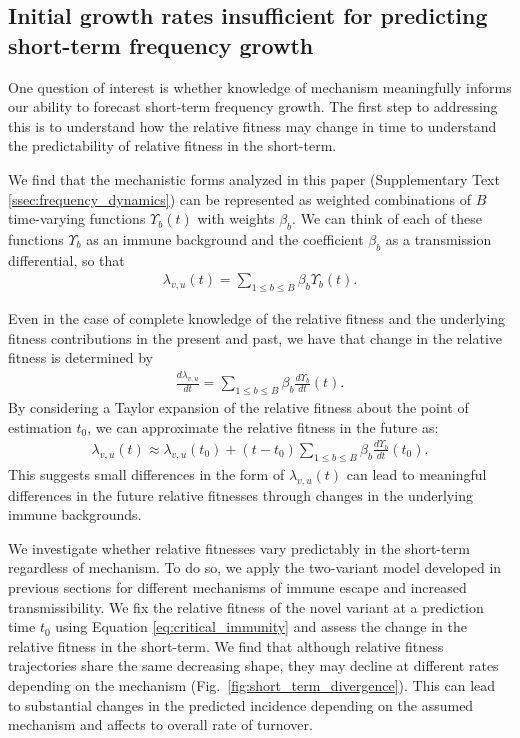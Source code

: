 \documentclass[11pt,oneside,letterpaper]{article}
\begin{document}
\subsection*{Initial growth rates insufficient for predicting short-term frequency growth}

One question of interest is whether knowledge of mechanism meaningfully informs our ability to forecast short-term frequency growth.
The first step to addressing this is to understand how the relative fitness may change in time to understand the predictability of relative fitness in the short-term.

We find that the mechanistic forms analyzed in this paper (Supplementary Text \ref{ssec:frequency_dynamics}) can be represented as weighted combinations of $B$ time-varying functions $\Upsilon_{b}(t)$ with weights $\beta_{b}$.
We can think of each of these functions $\Upsilon_b$ as an immune background and the coefficient $\beta_{b}$ as a transmission differential, so that
\begin{align*}
\lambda_{v,u}(t) = \sum_{1 \leq b \leq B} \beta_{b} \Upsilon_{b}(t).
\end{align*}

Even in the case of complete knowledge of the relative fitness and the underlying fitness contributions in the present and past, we have that change in the relative fitness is determined by
\begin{align*}
    \frac{d\lambda_{v,u}}{dt} = \sum_{1 \leq b \leq B} \beta_{b} \frac{d\Upsilon_{b}}{dt}(t).
\end{align*}
By considering a Taylor expansion of the relative fitness about the point of estimation $t_{0}$, we can approximate the relative fitness in the future as:
\begin{align*}
    \lambda_{v,u}(t) \approx \lambda_{v,u}(t_{0}) + (t - t_0)\sum_{1\leq b \leq B} \beta_b \frac{d\Upsilon_b}{dt}(t_0).
\end{align*}
This suggests small differences in the form of $\lambda_{v,u}(t)$ can lead to meaningful differences in the future relative fitnesses through changes in the underlying immune backgrounds.

We investigate whether relative fitnesses vary predictably in the short-term regardless of mechanism.
To do so, we apply the two-variant model developed in previous sections for different mechanisms of immune escape and increased transmissibility.
We fix the relative fitness of the novel variant at a prediction time $t_{0}$ using Equation \ref{eq:critical_immunity} and assess the change in the relative fitness in the short-term.
We find that although relative fitness trajectories share the same decreasing shape, they may decline at different rates depending on the mechanism (Fig.~\ref{fig:short_term_divergence}).
This can lead to substantial changes in the predicted incidence depending on the assumed mechanism and affects to overall rate of turnover.
\end{document}
